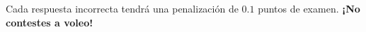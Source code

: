 \documentclass[answers,addpoints,14pt]{exam}
\begin{document}


%		
%	
%
%	
%	
%	
%		
%		



\vspace*{-2ex}

\vspace{3ex}


\begin{learn}
{Cada respuesta incorrecta tendrá una penalización de $0.1$ puntos de examen. \textbf{¡No contestes a voleo!}}
\end{learn}	
		\vspace{0ex}
		
\end{document}
